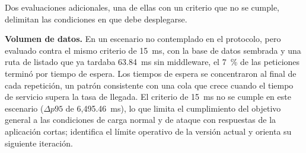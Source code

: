 Dos evaluaciones adicionales, una de ellas con un criterio que no se cumple, delimitan las
condiciones en que debe desplegarse.

\textbf{Volumen de datos.} En un escenario no contemplado en el protocolo, pero evaluado contra el mismo criterio de 15~ms, con la base de datos
sembrada y una ruta de listado que ya tardaba 63.84~ms sin middleware, el 7~\% de las peticiones
terminó por tiempo de espera. Los tiempos de espera se concentraron al final de cada repetición,
un patrón consistente con una cola que crece cuando el tiempo de servicio supera la tasa de
llegada. El criterio de 15~ms no se cumple en este escenario ($\Delta p95$ de 6{,}495.46~ms), lo que
limita el cumplimiento del objetivo general a las condiciones de carga normal y de ataque con
respuestas de la aplicación cortas; identifica el límite operativo de la versión actual y
orienta su siguiente iteración.

